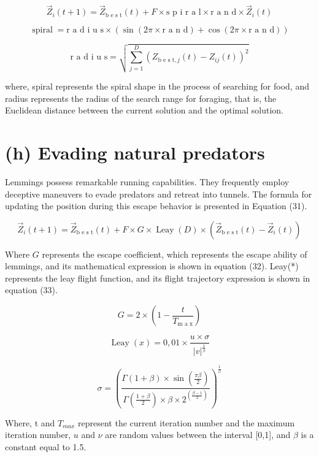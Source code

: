 \documentclass[
  10
]{article}
\begin{document}
\[
\overrightarrow {Z} _ {i} (t + 1) = \overrightarrow {Z} _ {\text {b e s t}} (t) + F \times \text {s p i r a l} \times \text {r a n d} \times \overrightarrow {Z} _ {i} (t) \tag {28}
\]

\[
\operatorname {s p i r a l} = \text {r a d i u s} \times (\sin (2 \pi \times \text {r a n d}) + \cos (2 \pi \times \text {r a n d})) \tag {29}
\]

\[
\text {r a d i u s} = \sqrt {\sum_ {j = 1} ^ {D} \left(Z _ {\text {b e s t} , j} (t) - Z _ {i j} (t)\right) ^ {2}} \tag {30}
\]

where, spiral represents the spiral shape in the process of searching
for food, and radius represents the radius of the search range for
foraging, that is, the Euclidean distance between the current solution
and the optimal solution.

\section{(h) Evading natural
predators}\label{h-evading-natural-predators}

Lemmings possess remarkable running capabilities. They frequently employ
deceptive maneuvers to evade predators and retreat into tunnels. The
formula for updating the position during this escape behavior is
presented in Equation (31).

\[
\overrightarrow {Z} _ {i} (t + 1) = \overrightarrow {Z} _ {\text {b e s t}} (t) + F \times G \times \operatorname {L e a y} (D) \times \left(\overrightarrow {Z} _ {\text {b e s t}} (t) - \overrightarrow {Z} _ {i} (t)\right) \tag {31}
\]

Where \(G\) represents the escape coefficient, which represents the
escape ability of lemmings, and its mathematical expression is shown in
equation (32). Leay(*) represents the leay flight function, and its
flight trajectory expression is shown in equation (33).

\[
G = 2 \times \left(1 - \frac {t}{T _ {\text {m a x}}}\right) \tag {32}
\]

\[
\operatorname {L e a y} (x) = 0, 0 1 \times \frac {u \times \sigma}{| v | ^ {\frac {1}{\beta}}} \tag {33}
\]

\[
\sigma = \left(\frac {\Gamma (1 + \beta) \times \sin \left(\frac {\pi \beta}{2}\right)}{\Gamma \left(\frac {1 + \beta}{2}\right) \times \beta \times 2 ^ {\left(\frac {\beta - 1}{2}\right)}}\right) ^ {\frac {1}{\beta}} \tag {34}
\]

Where, t and \(T _ { m a x }\) represent the current iteration number
and the maximum iteration number, \(u\) and \(\nu\) are random values
between the interval {[}0,1{]}, and \(\beta\) is a constant equal to
1.5.
\end{document}
